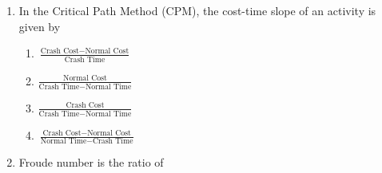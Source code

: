 \documentclass[12pt,onecolumn]{article}
\begin{document}
\begin{enumerate}
    \item In the Critical Path Method (CPM), the cost-time slope of an activity is given by
          \begin{enumerate}
              \item $\frac{\text{Crash Cost} - \text{Normal Cost}}{\text{Crash Time}}$
              \item $\frac{\text{Normal Cost}}{\text{Crash Time} - \text{Normal Time}}$
              \item $\frac{\text{Crash Cost}}{\text{Crash Time} - \text{Normal Time}}$
              \item $\frac{\text{Crash Cost} - \text{Normal Cost}}{\text{Normal Time} - \text{Crash Time}}$
          \end{enumerate}

    \item Froude number is the ratio of
          \begin{enumerate}
          \end{enumerate}


\end{enumerate}
\end{document}
